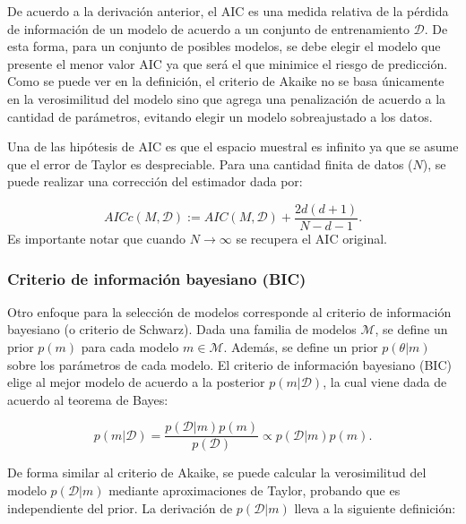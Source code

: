 De acuerdo a la derivación anterior, el AIC es una medida relativa de la pérdida de información de un modelo de acuerdo a un conjunto de entrenamiento $\mathcal{D}$. De esta forma, para un conjunto de posibles modelos, se debe elegir el modelo que presente el menor valor AIC ya que será el que minimice el riesgo de predicción.\\

Como se puede ver en la definición, el criterio de Akaike no se basa únicamente en la verosimilitud del modelo sino que agrega una penalización de acuerdo a la cantidad de parámetros, evitando elegir un modelo sobreajustado a los datos. 

\begin{remark}
	Una de las hipótesis de AIC es que el espacio muestral es infinito ya que se asume que el error de Taylor es despreciable. Para una cantidad finita de datos ($N$), se puede realizar una corrección del estimador dada por:
	
	\begin{equation}
		AICc(M,\mathcal{D}) := AIC(M,\mathcal{D}) + \frac{2d(d+1)}{N-d-1}.
	\end{equation}
Es importante notar que cuando $N\to\infty$ se recupera el AIC original.
\end{remark}

\subsubsection{Criterio de información bayesiano (BIC)}

Otro enfoque para la selección de modelos corresponde al criterio de información bayesiano (o criterio de Schwarz). Dada una familia de modelos $\mathcal{M}$, se define un prior $p(m)$ para cada modelo $m\in\mathcal{M}$. Además, se define un prior $p(\theta|m)$ sobre los parámetros de cada modelo. El criterio de información bayesiano (BIC) elige al mejor modelo de acuerdo a la posterior $p(m|\mathcal{D})$, la cual viene dada de acuerdo al teorema de Bayes:

\begin{equation}
	p(m|\mathcal{D})=\frac{p(\mathcal{D}|m)p(m)}{p(\mathcal{D})}\propto p(\mathcal{D}|m)p(m).
\end{equation}

De forma similar al criterio de Akaike, se puede calcular la verosimilitud del modelo $p(\mathcal{D}|m)$ mediante aproximaciones de Taylor, probando que es independiente del prior. La derivación de $p(\mathcal{D}|m)$ lleva a la siguiente definición:

